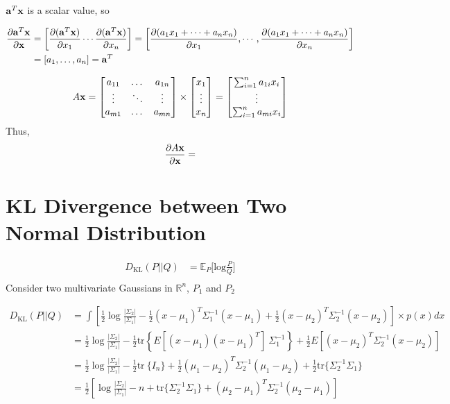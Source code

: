 \begin{appendices}
${\mathbf{a}}^T{\mathbf{x}}$ is a scalar value, so 

\begin{align*}
	\frac{\partial {\mathbf{a}}^T{\mathbf{x}}}{\partial {\mathbf{x}}} &= \bigg[\frac{\partial ({\mathbf{a}}^T{\mathbf{x}})}{\partial x_1} \cdots \frac{\partial ({\mathbf{a}}^T{\mathbf{x}})}{\partial x_n}\bigg] = \bigg[\frac{\partial (a_1x_1+\dots+a_nx_n)}{\partial x_1}, \cdots, \frac{\partial (a_1x_1+\dots+a_nx_n)}{\partial x_n}\bigg]\\ 
	&= [a_1, \dots, a_n] = {\mathbf{a}}^T
\end{align*}

\begin{align*}
	A{\mathbf{x}} = \begin{bmatrix}
		a_{11} & \dots & a_{1n}\\
		\vdots & \ddots & \vdots\\
		a_{m1} & \dots & a_{mn}\\
	\end{bmatrix}\times
	\begin{bmatrix}
		x_1\\
		\vdots\\
		x_n
		\end{bmatrix} = \begin{bmatrix}
		\sum_{i=1}^n a_{1i}x_i\\
		\vdots\\
		\sum_{i=1}^n a_{mi}x_i\\
	\end{bmatrix}
\end{align*}
Thus, 
\begin{align*}
	\frac{\partial A{\mathbf{x}}}{\partial {\mathbf{x}}} = 
\end{align*}

\section{KL Divergence between Two Normal Distribution}
\begin{align*}
D_\text{KL}(P||Q) & = \mathbb{E}_P\Big[\textrm{log}\frac{P}{Q}\Big]\\
\end{align*}
Consider two multivariate Gaussians in $\mathbb{R}^n$, $P_1$ and $P_2$

\begin{align*}
D_\text{KL}(P||Q) &= \int \left[ \frac{1}{2} \log\frac{|\Sigma_2|}{|\Sigma_1|} - \frac{1}{2} (x-\mu_1)^T\Sigma_1^{-1}(x-\mu_1) + \frac{1}{2} (x-\mu_2)^T\Sigma_2^{-1}(x-\mu_2) \right] \times p(x) dx \\
&= \frac{1}{2} \log\frac{|\Sigma_2|}{|\Sigma_1|} - \frac{1}{2} \text{tr} \left\{E[(x - \mu_1)(x - \mu_1)^T] \ \Sigma_1^{-1} \right\} + \frac{1}{2} E[(x - \mu_2)^T \Sigma_2^{-1} (x - \mu_2)] \\
&= \frac{1}{2} \log\frac{|\Sigma_2|}{|\Sigma_1|} - \frac{1}{2} \text{tr}\ \{I_n \} + \frac{1}{2} (\mu_1 - \mu_2)^T \Sigma_2^{-1} (\mu_1 - \mu_2) + \frac{1}{2} \text{tr} \{ \Sigma_2^{-1} \Sigma_1 \} \\
&= \frac{1}{2}\left[\log\frac{|\Sigma_2|}{|\Sigma_1|} - n + \text{tr} \{ \Sigma_2^{-1}\Sigma_1 \} + (\mu_2 - \mu_1)^T \Sigma_2^{-1}(\mu_2 - \mu_1)\right]
\end{align*}


\end{appendices}
